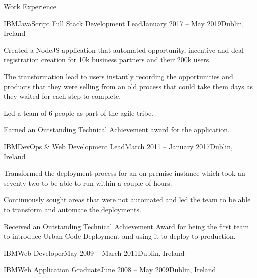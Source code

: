 \documentclass[]{kyvernitis-resume}
\begin{document}
\begin{section}{Work Experience}
 \begin{subsection}{IBM}{JavaScript Full Stack Development Lead}{January 2017 -- May 2019}{Dublin, Ireland}
	 \item Created a NodeJS application that automated opportunity, incentive and deal registration creation for 10k business partners and their 200k users.
	 \item The transformation lead to users instantly recording the opportunities and products that they were selling from an old process that could take them days as they waited for each step to complete.
	 \item Led a team of 6 people as part of the agile tribe.
	 \item Earned an Outstanding Technical Achievement award for the application.
 \end{subsection}

 \begin{subsection}{IBM}{DevOps \& Web Development Lead}{March 2011 -- January 2017}{Dublin, Ireland}
	 \item Transformed the deployment process for an on-premise instance which took an seventy two to be able to run within a couple of hours.
	 \item Continuously sought areas that were not automated and led the team to be able to transform and automate the deployments.
	 \item Received an Outstanding Technical Achievement Award for being the first team to introduce Urban Code Deployment and using it to deploy to production.
 \end{subsection}

 \begin{subsectionnolist}{IBM}{Web Developer}{May 2009 -- March 2011}{Dublin, Ireland}
 \end{subsectionnolist}

 \begin{subsectionnolist}{IBM}{Web Application Graduate}{June 2008 -- May 2009}{Dublin, Ireland}
 \end{subsectionnolist}

\end{section}


\end{document}

